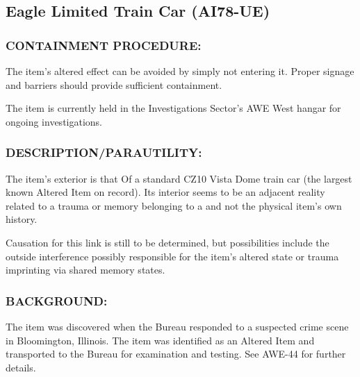 \subsection*{Eagle Limited Train Car (AI78-UE)}
\subsubsection*{CONTAINMENT PROCEDURE:}
\par The item's altered effect can be avoided
by simply not entering it. Proper signage
and barriers should provide sufficient
containment.
\par The item is currently held in the
Investigations Sector's AWE West
hangar for ongoing investigations.
\subsubsection*{DESCRIPTION/PARAUTILITY:}
\par The item's exterior is that Of a standard CZ10 Vista Dome train
car (the largest known Altered Item on record). Its interior seems
to be an adjacent reality related to a trauma or memory belonging
to a  and not the physical item's own history.
\par Causation for this link is still to be determined, but possibilities
include the outside interference possibly responsible for the
item's altered state or trauma imprinting via shared memory
states.
\subsubsection*{BACKGROUND:}
\par The item was discovered when the Bureau responded to a
suspected crime scene in Bloomington, Illinois. The item was
identified as an Altered Item and transported to the Bureau for
examination and testing. See AWE-44 for further details.